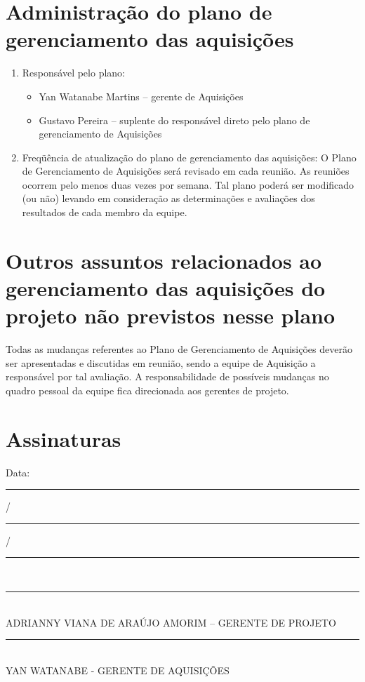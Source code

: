 \section*{Administração do plano de gerenciamento das aquisições}
\begin{enumerate}
\item Responsável pelo plano:
\begin{itemize}
\item Yan Watanabe Martins – gerente de Aquisições
\item Gustavo Pereira – suplente do responsável direto pelo plano de gerenciamento de Aquisições
\end{itemize}
\item Freqüência de atualização do plano de gerenciamento das aquisições:
O Plano de Gerenciamento de Aquisições será revisado em cada reunião. As reuniões ocorrem pelo menos duas vezes por semana. Tal plano poderá ser modificado (ou não) levando em consideração as determinações e avaliações dos resultados de cada membro da equipe. 
\end{enumerate}

\section*{Outros assuntos relacionados ao gerenciamento das aquisições do projeto não previstos nesse plano}
Todas as mudanças referentes ao Plano de Gerenciamento de Aquisições deverão ser apresentadas e discutidas em reunião, sendo a equipe de Aquisição a responsável por tal avaliação. A responsabilidade de possíveis mudanças no quadro pessoal da equipe fica direcionada aos gerentes de projeto.

\section*{Assinaturas}
\begin{center}
Data: \rule{0.5cm}{0.1mm}/\rule{0.5cm}{0.1mm}/\rule{1cm}{0.1mm}     \\
\rule{13cm}{0.1mm}\\
ADRIANNY VIANA DE ARAÚJO AMORIM – GERENTE DE PROJETO\\
\rule{13cm}{0.1mm}\\
YAN WATANABE - GERENTE DE AQUISIÇÕES

\end{center}
% 